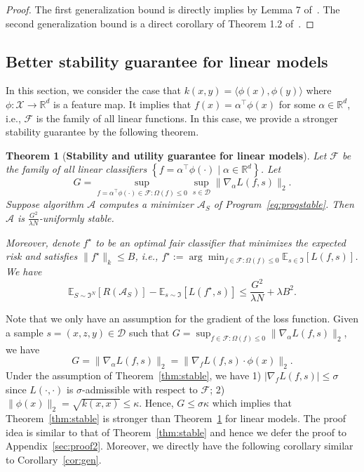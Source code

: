 \documentclass[11pt]{article}
\newcommand{\Exp}{\mathbb{E}}
\newtheorem{theorem}{Theorem}[section]
\newcommand{\R}{\mathbb{R}}
\newcommand{\calA}{\mathcal{A}}
\newcommand{\calD}{\mathcal{D}}
\newcommand{\calF}{\mathcal{F}}
\newcommand{\calX}{\mathcal{X}}
\begin{document}
	\begin{proof}
		The first generalization bound is directly implies by Lemma 7 of~\cite{bousquet2002stability}.
		The second generalization bound is a direct corollary of Theorem 1.2 of~\cite{feldman2018generalization}.
	\end{proof}
	
	
	\subsection{Better stability guarantee for linear models}
	\label{subsec:euclidean}
	
	In this section, we consider the case that $k(x,y)=\langle \phi(x),\phi(y) \rangle$ where $\phi: \calX\rightarrow \R^d$ is a feature map.
	It implies that $f(x) = \alpha^\top \phi(x)$ for some $\alpha\in \R^d$, i.e., $\calF$ is the family of all linear functions.
	In this case, we provide a stronger stability guarantee by the following theorem.
	
	\begin{theorem}[\textbf{Stability and utility guarantee for linear models}]
		\label{thm:stable2}
		Let $\calF$ be the family of all linear classifiers $\left\{f=\alpha^\top \phi(\cdot)\mid \alpha\in \R^d \right\}$. 
		Let 
		\[
		G = \sup_{f=\alpha^\top \phi(\cdot)\in \calF: \Omega(f)\leq 0} \sup_{s\in \calD} \|\nabla_\alpha L(f,s)\|_2.
		\]
		Suppose algorithm $\calA$ computes a minimizer $\calA_S$ of Program~\eqref{eq:progstable}.
		Then $\calA$ is $\frac{G^2}{\lambda N}$-uniformly stable.
		
		Moreover, denote $f^\star$ to be an optimal fair classifier that minimizes the expected risk and satisfies $\|f^\star\|_k\leq B$, i.e., 
		$f^\star:= \arg \min_{f\in \calF: \Omega(f)\leq 0} \Exp_{s\in \Im}\left[ L(f,s)\right]$.
		We have
		\[
		\Exp_{S\sim \Im^N} \left[R(\calA_S) \right] - \Exp_{s\sim \Im} \left[L(f^\star,s)\right] \leq \frac{G^2}{\lambda N}+\lambda B^2.
		\]
	\end{theorem}
	
	\noindent
	Note that we only have an assumption for the gradient of the loss function.
	Given a sample $s=(x,z,y)\in \calD$ such that $G = \sup_{f\in \calF: \Omega(f)\leq 0} \|\nabla_\alpha L(f,s)\|_2$, we have
	\[
	G=\|\nabla_\alpha L(f,s)\|_2 = \|\nabla_f L(f,s) \cdot \phi(x)\|_2.
	\]
	Under the assumption of Theorem~\ref{thm:stable}, we have 1) $|\nabla_f L(f,s)|\leq \sigma$ since $L(\cdot,\cdot)$ is $\sigma$-admissible with respect to $\calF$; 2) $\|\phi(x)\|_2=\sqrt{k(x,x)}\leq \kappa$.
	Hence, $G\leq \sigma \kappa$ which implies that Theorem~\ref{thm:stable} is stronger than Theorem~\ref{thm:stable2} for linear models.
	The proof idea is similar to that of Theorem~\ref{thm:stable} and hence we defer the proof to Appendix~\ref{sec:proof2}.
	Moreover, we directly have the following corollary similar to Corollary~\ref{cor:gen}.
	
\end{document}
